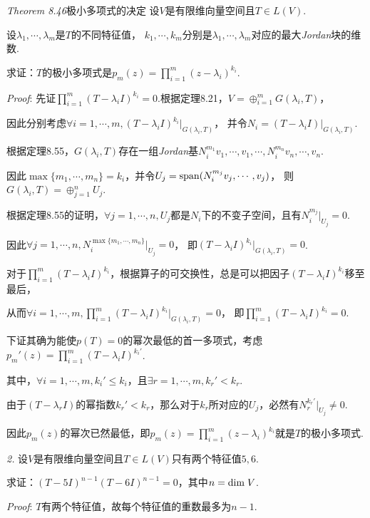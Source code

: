 \textit{Theorem 8.46}{\kaishu 极小多项式的决定}
设\(V\)是有限维向量空间且\(T \in L(V)\).

设\(\lambda_1,\cdots,\lambda_m\)是\(T\)的不同特征值，
\(k_1,\cdots,k_m\)分别是\(\lambda_1,\cdots,\lambda_m\)对应的最大\textit{Jordan}块的维数.

求证：\(T\)的极小多项式是\(p_m(z)=\prod_{i=1}^m (z-\lambda_i)^{k_i}\).

\textit{Proof}:
先证\(\prod_{i=1}^m (T-\lambda_i I)^{k_i}=0\).根据定理8.21，\(V=\oplus_{i=1}^m G(\lambda_i,T)\)，

因此分别考虑\(\forall i=1,\cdots,m,(T-\lambda_i I)^{k_i}|_{G(\lambda_i,T)}\)，
并令\(N_i=(T-\lambda_i I)|_{G(\lambda_i,T)}\).

根据定理8.55，\(G(\lambda_i,T)\)存在一组\textit{Jordan}基\(N_i^{m_1}v_1,\cdots,v_1,\cdots,N_i^{m_n}v_n,\cdots,v_n\).

因此\(\max \{m_1,\cdots,m_n\}=k_i\)，并令\(U_j=\mathrm{span} (N_i^{m_j}v_j,\cdots,v_j)\)，
则\(G(\lambda_i,T)=\oplus_{j=1}^n U_j\).

根据定理8.55的证明，\(\forall j=1,\cdots,n,U_j\)都是\(N_i\)下的不变子空间，且有\(N_i^{m_j}|_{U_j}=0\).

因此\(\forall j=1,\cdots,n,N_i^{\max \{m_1,\cdots,m_n\}}|_{U_j}=0\)，
即\((T-\lambda_i I)^{k_i}|_{G(\lambda_i,T)}=0\).

对于\(\prod_{i=1}^m (T-\lambda_i I)^{k_i}\)，根据算子的可交换性，总是可以把因子\((T-\lambda_i I)^{k_i}\)移至最后，

从而\(\forall i=1,\cdots,m,\prod_{i=1}^m (T-\lambda_i I)^{k_i}|_{G(\lambda_i,T)}=0\)，
即\(\prod_{i=1}^m (T-\lambda_i I)^{k_i}=0\).

下证其确为能使\(p(T)=0\)的幂次最低的首一多项式，考虑\(p_m'(z)=\prod_{i=1}^m (T-\lambda_i I)^{k_i'}\).

其中，\(\forall i=1,\cdots,m,k_i' \leq k_i\)，且\(\exists r=1,\cdots,m,k_r'<k_r\).

由于\((T-\lambda_r I)\)的幂指数\(k_r'<k_r\)，那么对于\(k_r\)所对应的\(U_j\)，必然有\(N_r^{k_r'}|_{U_j} \ne 0\).

因此\(p_m(z)\)的幂次已然最低，即\(p_m(z)=\prod_{i=1}^m (z-\lambda_i)^{k_i}\)就是\(T\)的极小多项式.

\hspace*{\fill}

\textit{2.}
设\(V\)是有限维向量空间且\(T \in L(V)\)只有两个特征值\(5,6\).

求证：\((T-5I)^{n-1}(T-6I)^{n-1}=0\)，其中\(n=\mathrm{dim \;} V\).

\textit{Proof}:
\(T\)有两个特征值，故每个特征值的重数最多为\(n-1\).

